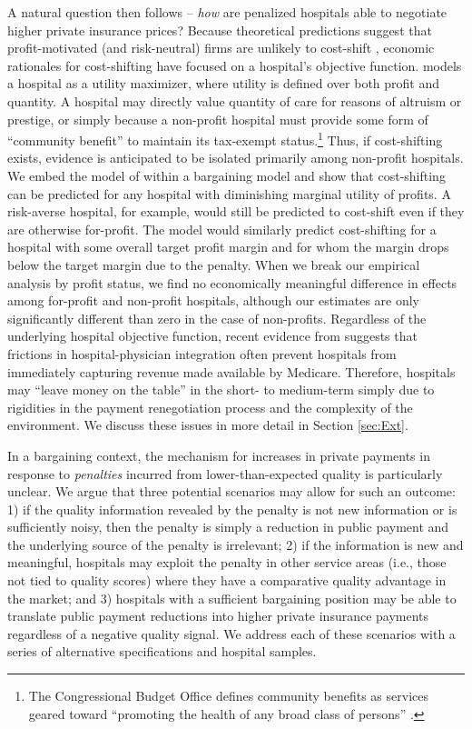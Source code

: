 \documentclass[12pt]{article}
\begin{document}
A natural question then follows -- \textit{how} are penalized hospitals able to negotiate higher private insurance prices? Because theoretical predictions suggest that profit-motivated (and risk-neutral) firms are unlikely to cost-shift \citep{hay1983}, economic rationales for cost-shifting have focused on a hospital's objective function. \cite{dranove1988} models a hospital as a utility maximizer, where utility is defined over both profit and quantity.  A hospital may directly value quantity of care for reasons of altruism or prestige, or simply because a non-profit hospital must provide some form of ``community benefit'' to maintain its tax-exempt status.\footnote{The Congressional Budget Office defines community benefits as services geared toward ``promoting the health of any broad class of persons'' \citep{cbo2006}.}  Thus, if cost-shifting exists, evidence is anticipated to be isolated primarily among non-profit hospitals. We embed the model of \cite{dranove1988} within a bargaining model \citep{ho2017} and show that cost-shifting can be predicted for any hospital with diminishing marginal utility of profits. A risk-averse hospital, for example, would still be predicted to cost-shift even if they are otherwise for-profit. The model would similarly predict cost-shifting for a hospital with some overall target profit margin and for whom the margin drops below the target margin due to the penalty. When we break our empirical analysis by profit status, we find no economically meaningful difference in effects among for-profit and non-profit hospitals, although our estimates are only significantly different than zero in the case of non-profits.  Regardless of the underlying hospital objective function, recent evidence from \citet{sacarny2018} suggests that frictions in hospital-physician integration often prevent hospitals from immediately capturing revenue made available by Medicare. Therefore, hospitals may ``leave money on the table'' in the short- to medium-term simply due to rigidities in the payment renegotiation process and the complexity of the environment. We discuss these issues in more detail in Section \ref{sec:Ext}.

In a bargaining context, the mechanism for increases in private payments in response to \textit{penalties} incurred from lower-than-expected quality is particularly unclear. We argue that three potential scenarios may allow for such an outcome: 1) if the quality information revealed by the penalty is not new information or is sufficiently noisy, then the penalty is simply a reduction in public payment and the underlying source of the penalty is irrelevant; 2) if the information is new and meaningful, hospitals may exploit the penalty in other service areas (i.e., those not tied to quality scores) where they have a comparative quality advantage in the market; and 3)  hospitals with a sufficient bargaining position may be able to translate public payment reductions into higher private insurance payments regardless of a negative quality signal. We address each of these scenarios with a series of alternative specifications and hospital samples.
\end{document}
